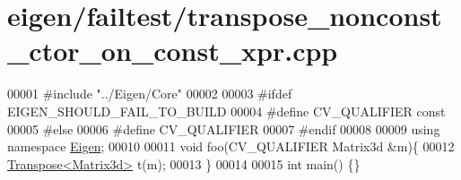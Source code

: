 \hypertarget{eigen_2failtest_2transpose__nonconst__ctor__on__const__xpr_8cpp_source}{}\section{eigen/failtest/transpose\+\_\+nonconst\+\_\+ctor\+\_\+on\+\_\+const\+\_\+xpr.cpp}
\label{eigen_2failtest_2transpose__nonconst__ctor__on__const__xpr_8cpp_source}

\begin{DoxyCode}
00001 \textcolor{preprocessor}{#include "../Eigen/Core"}
00002 
00003 \textcolor{preprocessor}{#ifdef EIGEN\_SHOULD\_FAIL\_TO\_BUILD}
00004 \textcolor{preprocessor}{#define CV\_QUALIFIER const}
00005 \textcolor{preprocessor}{#else}
00006 \textcolor{preprocessor}{#define CV\_QUALIFIER}
00007 \textcolor{preprocessor}{#endif}
00008 
00009 \textcolor{keyword}{using namespace }\hyperlink{namespace_eigen}{Eigen};
00010 
00011 \textcolor{keywordtype}{void} foo(CV\_QUALIFIER Matrix3d &m)\{
00012     \hyperlink{group___core___module_class_eigen_1_1_transpose}{Transpose<Matrix3d>} t(m);
00013 \}
00014 
00015 \textcolor{keywordtype}{int} main() \{\}
\end{DoxyCode}
